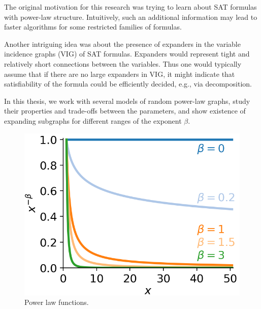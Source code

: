 The original motivation for this research was trying to learn
about SAT formulas with power-law structure.
Intuitively, such an additional information may lead
to faster algorithms for some restricted families of formulas.

Another intriguing idea was about the presence of expanders
in the variable incidence graphs (VIG) of SAT formulas.
Expanders would represent tight and relatively short connections
between the variables. Thus one would typically assume that if there are
no large expanders in VIG, it might indicate that satisfiability
of the formula could be efficiently decided, e.g., via decomposition.

In this thesis, we work with several models of random power-law graphs,
study their properties and trade-offs between the parameters,
and show existence of expanding subgraphs for different ranges of the exponent $\beta$.

\begin{figure}
    \centering
    \includegraphics[scale=0.75]{images/generated/power-law}
    \caption{Power law functions.}
    \label{fig:power-law-functions}
\end{figure}

